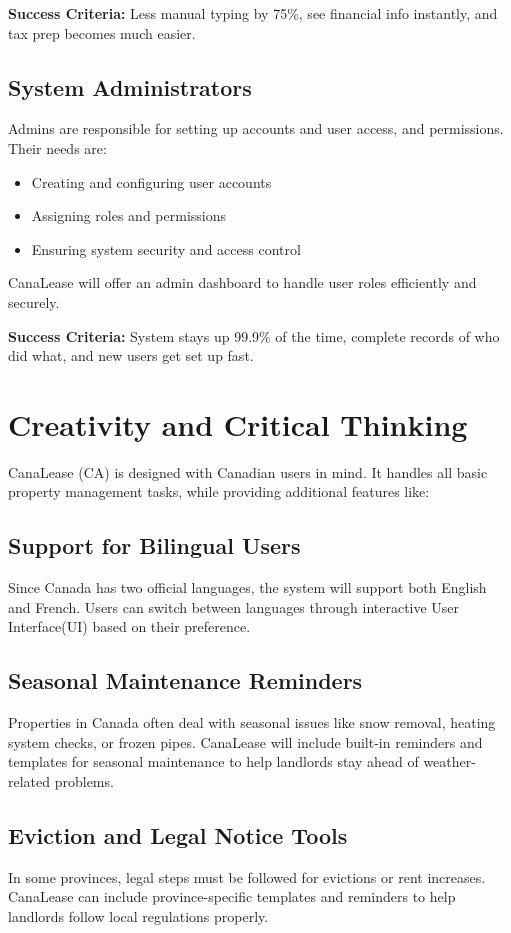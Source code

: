 \documentclass[12pt]{article}
\begin{document}
\textbf{Success Criteria:} Less manual typing by 75\%, see financial info instantly, and tax prep becomes much easier.

\subsection{System Administrators}
Admins are responsible for setting up accounts and user access, and permissions. Their needs are:
\begin{itemize}
    \item Creating and configuring user accounts
    \item Assigning roles and permissions
    \item Ensuring system security and access control
\end{itemize}
CanaLease will offer an admin dashboard to handle user roles efficiently and securely.

\textbf{Success Criteria:} System stays up 99.9\% of the time, complete records of who did what, and new users get set up fast.

\section{Creativity and Critical Thinking}

CanaLease (CA) is designed with Canadian users in mind. It handles all basic property management tasks, while providing additional features like: 

\subsection{Support for Bilingual Users}
Since Canada has two official languages, the system will support both English and French. Users can switch between languages through interactive User Interface(UI) based on their preference.

\subsection{Seasonal Maintenance Reminders}
Properties in Canada often deal with seasonal issues like snow removal, heating system checks, or frozen pipes. CanaLease will include built-in reminders and templates for seasonal maintenance to help landlords stay ahead of weather-related problems.

\subsection{Eviction and Legal Notice Tools}
In some provinces, legal steps must be followed for evictions or rent increases. CanaLease can include province-specific templates and reminders to help landlords follow local regulations properly.
\end{document}
